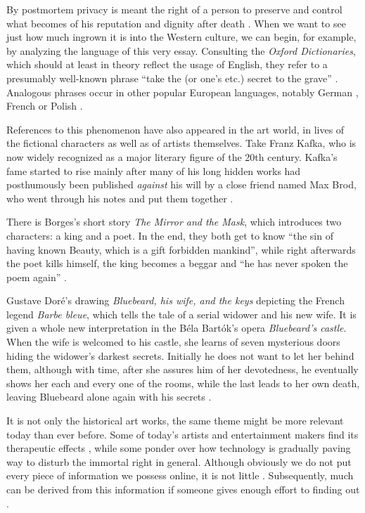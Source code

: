\medskip
By postmortem privacy is meant the right of a person to preserve and control what becomes of his reputation and dignity after death \cite{harbinja2, buitelaar}. When we want to see just how much ingrown it is into the Western culture, we can begin, for example, by analyzing the language of this very essay. Consulting the \textit{Oxford Dictionaries}, which should at least in theory reflect the usage of English, they refer to a presumably well-known phrase ``take the (or one's etc.) secret to the grave'' \cite{oxford}. Analogous phrases occur in other popular European languages, notably German \cite{duden}, French \cite{larousse} or Polish \cite{wsjp}.

References to this phenomenon have also appeared in the art world, in lives of the fictional characters as well as of artists themselves. Take Franz Kafka, who is now widely recognized as a major literary figure of the 20th century.
Kafka's fame started to rise mainly after many of his long hidden works had posthumously been published \emph{against} his will by a close friend named Max Brod, who went through his notes and put them together \cite{kafka, brod}.

There is Borges's short story \textit{The Mirror and the Mask}, which introduces two characters: a king and a poet. In the end, they both get to know ``the sin of having known Beauty, which is a gift forbidden mankind'', while right afterwards the poet kills himself, the king becomes a beggar and ``he has never spoken the poem again'' \cite{borges}.

Gustave Doré's drawing \textit{Bluebeard, his wife, and the keys} \cite{dore} depicting the French legend \textit{Barbe bleue}, which tells the tale of a serial widower and his new wife. It is given a whole new interpretation in the Béla Bartók's opera \textit{Bluebeard's castle}.
When the wife is welcomed to his castle, she learns of seven mysterious doors hiding the widower's darkest secrets.
Initially he does not want to let her behind them, although with time, after she assures him of her devotedness, he eventually shows her each and every one of the rooms, while the last leads to her own death, leaving Bluebeard alone again with his secrets \cite{keiser}.

It is not only the historical art works, the same theme might be more relevant today than ever before. Some of today's artists and entertainment makers find its therapeutic effects \cite{sophie-calle}, while some ponder over how technology is gradually paving way to disturb the immortal right in general.
Although obviously we do not put every piece of information we possess online, it is not little \cite{marr}. Subsequently, much can be derived from this information if someone gives enough effort to finding out \cite{like, datascience}.

